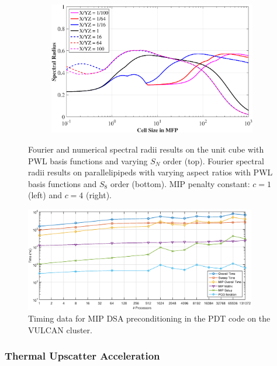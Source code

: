 \documentclass[11pt]{article}
\begin{document}
\begin{figure}
\begin{subfigure}[b]{0.48\textwidth}
	\end{subfigure}
	\hfill
	\begin{subfigure}[b]{0.48\textwidth}
		\centering
		\includegraphics[width=\textwidth]{figures/SI_MIP_hex_LS8_C=4_AR.eps}
	\end{subfigure}
\caption{Fourier and numerical spectral radii results on the unit cube with PWL basis functions and varying $S_N$ order (top). Fourier spectral radii results on parallelipipeds with varying aspect ratios with PWL basis functions and $S_8$ order (bottom). MIP penalty constant: $c=1$ (left) and $c=4$ (right).}
\label{fig::fourier_NSR}
\end{figure}

\begin{figure}
\centering
\includegraphics[width=0.90\textwidth]{figures/Vulcan_DSA_Timing.eps}
\caption{Timing data for MIP DSA preconditioning in the PDT code on the VULCAN cluster.}
\label{fig::Vulcan_MIP_Timing}
\end{figure}

\subsubsection{Thermal Upscatter Acceleration}
\label{sec::CW_DSA_Upscatter}
\end{document}
